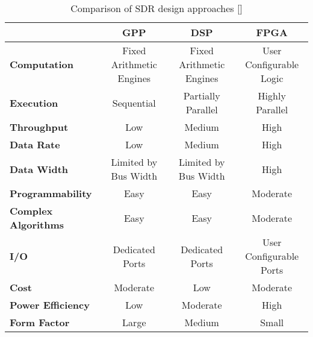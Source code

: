 \begin{table}[ht]
  \caption{Comparison of SDR design approaches [\citeauthor{DBLP:journals/corr/abs-1804-06564}]}
  \label{table:sdr_approach_comparison}
  \centering
  \begin{adjustbox}{width=1\textwidth}
  \begin{tabular}{>{\bfseries}l|c|c|c}
    \toprule
    & \textbf{GPP} & \textbf{DSP} & \textbf{FPGA} \\
    \midrule
    Computation        & Fixed Arithmetic Engines & Fixed Arithmetic Engines & User Configurable Logic\\
    Execution          & Sequential               & Partially Parallel       & Highly Parallel\\
    Throughput         & Low                      & Medium                   & High\\
    Data Rate          & Low                      & Medium                   & High\\
    Data Width         & Limited by Bus Width     & Limited by Bus Width     & High\\
    Programmability    & Easy                     & Easy                     & Moderate\\
    Complex Algorithms & Easy                     & Easy                     & Moderate\\
    I/O                & Dedicated Ports          & Dedicated Ports          & User Configurable Ports\\
    Cost               & Moderate                 & Low                      & Moderate\\
    Power Efficiency   & Low                      & Moderate                 & High\\
    Form Factor        & Large                    & Medium                   & Small\\
    \bottomrule
  \end{tabular}
  \end{adjustbox}
\end{table}
